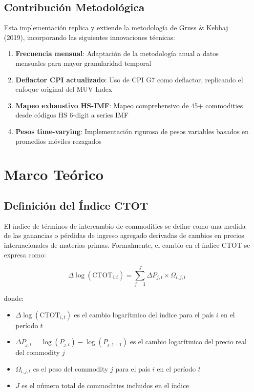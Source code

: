 \documentclass[12pt,a4paper]{article}
\begin{document}
\subsection{Contribución Metodológica}

Esta implementación replica y extiende la metodología de Gruss \& Kebhaj (2019), incorporando las siguientes innovaciones técnicas:

\begin{enumerate}
    \item \textbf{Frecuencia mensual}: Adaptación de la metodología anual a datos mensuales para mayor granularidad temporal
    \item \textbf{Deflactor CPI actualizado}: Uso de CPI G7 como deflactor, replicando el enfoque original del MUV Index
    \item \textbf{Mapeo exhaustivo HS-IMF}: Mapeo comprehensivo de 45+ commodities desde códigos HS 6-digit a series IMF
    \item \textbf{Pesos time-varying}: Implementación rigurosa de pesos variables basados en promedios móviles rezagados
\end{enumerate}

\section{Marco Teórico}

\subsection{Definición del Índice CTOT}

El índice de términos de intercambio de commodities se define como una medida de las ganancias o pérdidas de ingreso agregado derivadas de cambios en precios internacionales de materias primas. Formalmente, el cambio en el índice CTOT se expresa como:

\begin{equation}
\Delta \log(\text{CTOT}_{i,t}) = \sum_{j=1}^{J} \Delta P_{j,t} \times \Omega_{i,j,t}
\label{eq:ctot_main}
\end{equation}

donde:
\begin{itemize}
    \item $\Delta \log(\text{CTOT}_{i,t})$ es el cambio logarítmico del índice para el país $i$ en el período $t$
    \item $\Delta P_{j,t} = \log(P_{j,t}) - \log(P_{j,t-1})$ es el cambio logarítmico del precio real del commodity $j$
    \item $\Omega_{i,j,t}$ es el peso del commodity $j$ para el país $i$ en el período $t$
    \item $J$ es el número total de commodities incluidos en el índice
\end{itemize}
\end{document}
